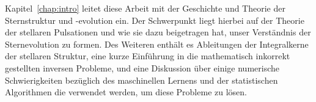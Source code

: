 Kapitel~\ref{chap:intro} leitet diese Arbeit mit der Geschichte und Theorie der Sternstruktur und -evolution ein. Der Schwerpunkt liegt hierbei auf der Theorie der stellaren Pulsationen und wie sie dazu beigetragen hat, unser Verst\"andnis der Sternevolution zu formen. Des Weiteren enth\"alt es Ableitungen der Integralkerne der stellaren Struktur, eine kurze Einf\"uhrung in die mathematisch inkorrekt gestellten inversen Probleme, und eine Diskussion \"uber einige numerische Schwierigkeiten bez\"uglich des maschinellen Lernens und der statistischen Algorithmen die verwendet werden, um diese Probleme zu l\"osen. 
